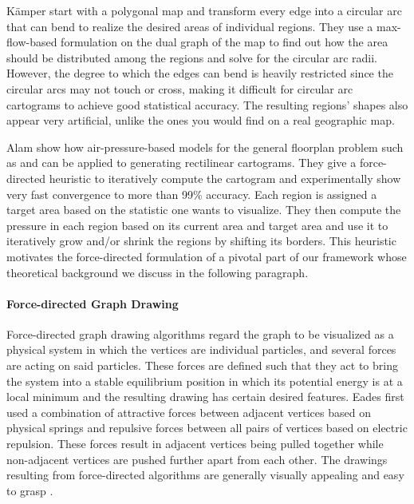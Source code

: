 Kämper \etal{} \cite{kamper2013circular} start with a polygonal map and transform every edge into a circular arc that can bend to realize the desired areas of individual regions.
They use a max-flow-based formulation on the dual graph of the map to find out how the area should be distributed among the regions and solve for the circular arc radii.
However, the degree to which the edges can bend is heavily restricted since the circular arcs may not touch or cross, making it difficult for circular arc cartograms to achieve good statistical accuracy.
The resulting regions' shapes also appear very artificial, unlike the ones you would find on a real geographic map.

Alam \etal{} \cite{alam2013computing} show how air-pressure-based models for the general floorplan problem such as \cite{izumi1998air} and \cite{felsner2013exploiting} can be applied to generating rectilinear cartograms.
They give a force-directed heuristic to iteratively compute the cartogram and experimentally show very fast convergence to more than 99\% accuracy.
Each region is assigned a target area based on the statistic one wants to visualize.
They then compute the pressure in each region based on its current area and target area and use it to iteratively grow and/or shrink the regions by shifting its borders.
This heuristic motivates the force-directed formulation of a pivotal part of our framework whose theoretical background we discuss in the following paragraph.


\paragraph{Force-directed Graph Drawing}

Force-directed graph drawing algorithms regard the graph to be visualized as a physical system in which the vertices are individual particles, and several forces are acting on said particles.
These forces are defined such that they act to bring the system into a stable equilibrium position in which its potential energy is at a local minimum and the resulting drawing has certain desired features.
Eades \cite{eades84heuristic} first used a combination of attractive forces between adjacent vertices based on physical springs and repulsive forces between all pairs of vertices based on electric repulsion.
These forces result in adjacent vertices being pulled together while non-adjacent vertices are pushed further apart from each other.
The drawings resulting from force-directed algorithms are generally visually appealing and easy to grasp \cite{kobourov2013force}.

